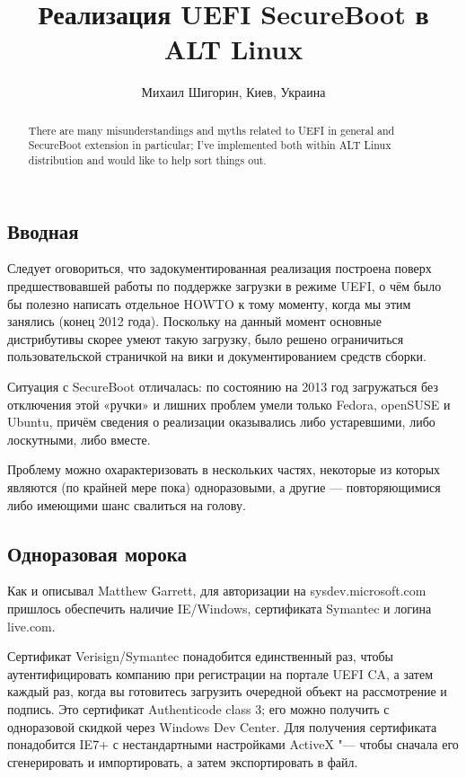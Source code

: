 \documentclass[10pt, a5paper]{article}
\begin{document}
\title{Реализация UEFI SecureBoot в ALT Linux}
\author{Михаил Шигорин, Киев, Украина}
\maketitle
\begin{abstract}
There are many misunderstandings and myths related to UEFI in general and SecureBoot extension in particular; I've implemented both within ALT Linux distribution and would like to help sort things out.
\end{abstract}
\subsection*{Вводная}

Следует оговориться, что задокументированная реализация построена поверх предшествовавшей работы по поддержке загрузки в режиме UEFI, о чём было бы полезно написать отдельное HOWTO к тому моменту, когда мы этим занялись (конец 2012 года).  Поскольку на данный момент основные дистрибутивы скорее умеют такую загрузку, было решено ограничиться пользовательской страничкой на вики и документированием средств сборки.

Ситуация с SecureBoot отличалась: по состоянию на 2013 год загружаться без отключения этой «ручки» и лишних проблем умели только Fedora, openSUSE и Ubuntu, причём сведения о реализации оказывались либо устаревшими, либо лоскутными, либо вместе.

Проблему можно охарактеризовать в нескольких частях, некоторые из которых являются (по крайней мере пока) одноразовыми, а другие --- повторяющимися либо имеющими шанс свалиться на голову.

\subsection*{Одноразовая морока}

Как и описывал Matthew Garrett, для авторизации на sysdev.mi\-cro\-soft.com пришлось обеспечить наличие IE/Windows, сертификата Symantec и логина live.com.

Сертификат Verisign/Symantec понадобится единственный раз, чтобы аутентифицировать компанию при регистрации на портале UEFI CA, а затем каждый раз, когда вы готовитесь загрузить очередной объект на рассмотрение и подпись. Это сертификат Au\-then\-ti\-code class 3; его можно получить с одноразовой скидкой через Windows Dev Center. Для получения сертификата понадобится IE7+ с нестандартными настройками ActiveX "--- чтобы сначала его сгенерировать и импортировать, а затем экспортировать в файл.
\end{document}
